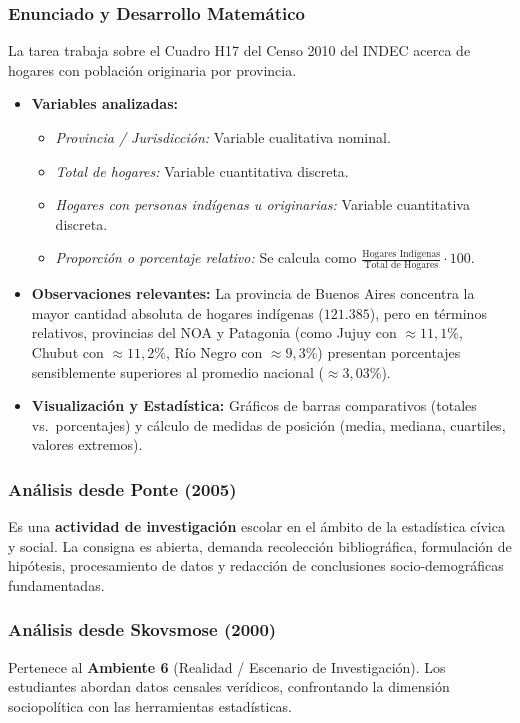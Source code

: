 \documentclass[11pt,a4paper]{article}
\begin{document}
\subsubsection{Enunciado y Desarrollo Matemático}
La tarea trabaja sobre el Cuadro H17 del Censo 2010 del INDEC acerca de hogares con población originaria por provincia.
\begin{itemize}
    \item[a)] \textbf{Variables analizadas:}
    \begin{itemize}
        \item \textit{Provincia / Jurisdicción:} Variable cualitativa nominal.
        \item \textit{Total de hogares:} Variable cuantitativa discreta.
        \item \textit{Hogares con personas indígenas u originarias:} Variable cuantitativa discreta.
        \item \textit{Proporción o porcentaje relativo:} Se calcula como $\frac{\text{Hogares Indígenas}}{\text{Total de Hogares}} \cdot 100$.
    \end{itemize}
    \item[b)] \textbf{Observaciones relevantes:} La provincia de Buenos Aires concentra la mayor cantidad absoluta de hogares indígenas ($121.385$), pero en términos relativos, provincias del NOA y Patagonia (como Jujuy con $\approx 11{,}1\%$, Chubut con $\approx 11{,}2\%$, Río Negro con $\approx 9{,}3\%$) presentan porcentajes sensiblemente superiores al promedio nacional ($\approx 3{,}03\%$).
    \item[c)] \textbf{Visualización y Estadística:} Gráficos de barras comparativos (totales vs.\ porcentajes) y cálculo de medidas de posición (media, mediana, cuartiles, valores extremos).
\end{itemize}

\subsubsection{Análisis desde Ponte (2005)}
Es una \textbf{actividad de investigación} escolar en el ámbito de la estadística cívica y social. La consigna es abierta, demanda recolección bibliográfica, formulación de hipótesis, procesamiento de datos y redacción de conclusiones socio-demográficas fundamentadas.

\subsubsection{Análisis desde Skovsmose (2000)}
Pertenece al \textbf{Ambiente 6} (Realidad / Escenario de Investigación). Los estudiantes abordan datos censales verídicos, confrontando la dimensión sociopolítica con las herramientas estadísticas.
\end{document}
